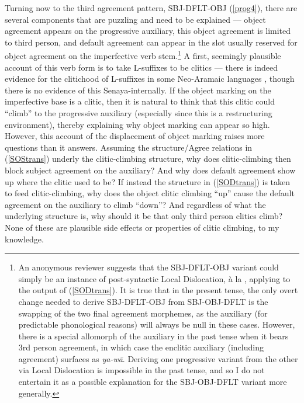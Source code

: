 \documentclass[output=paper
,modfonts
,nonflat]{langsci/langscibook}
\begin{document}
Turning now to the third agreement pattern, SBJ-DFLT-OBJ (\ref{prog4}), there are several components that are puzzling and need to be explained --- object agreement appears on the progressive auxiliary, this object agreement is limited to third person, and default agreement can appear in the slot usually reserved for object agreement on the imperfective verb stem.\footnote{An anonymous reviewer suggests that the SBJ-DFLT-OBJ variant could simply be an instance of post-syntactic Local Dislocation, \`a la \citet{EmbickNoyer01}, applying to the output of (\ref{SODtrans}). It is true that in the present tense, the only overt change needed to derive SBJ-DFLT-OBJ from SBJ-OBJ-DFLT is the swapping of the two final agreement morphemes, as the auxiliary (for predictable phonological reasons) will always be null in these cases. However, there is a special allomorph of the auxiliary in the past tense when it bears 3rd person agreement, in which case the enclitic auxiliary (including agreement) surfaces as \textit{ya-w\=a}. Deriving one progressive variant from the other via Local Dislocation is impossible in the past tense, and so I do not entertain it as a possible explanation for the SBJ-OBJ-DFLT variant more generally.} A first, seemingly  plausible account of this verb form is to take L-suffixes to be clitics --- there is indeed evidence for the clitichood of L-suffixes in some Neo-Aramaic languages \citep{DoronKhan12}, though there is no evidence of this Senaya-internally. If the object marking on the imperfective base is a clitic, then it is natural to think that this clitic could ``climb'' to the progressive auxiliary (especially since this is a restructuring environment), thereby explaining why object marking can appear so high. However, this account of the displacement of object marking raises more questions than it answers. Assuming the structure/Agree relations in (\ref{SOStrans}) underly the clitic-climbing structure, why does clitic-climbing then block subject agreement on the auxiliary? And why does default agreement show up where the clitic used to be? If instead the structure in (\ref{SODtrans}) is taken to feed clitic-climbing, why does the object clitic climbing ``up'' cause the default agreement on the auxiliary to climb ``down''? And regardless of what the underlying structure is, why should it be that only third person clitics climb? None of these are plausible side effects or properties of clitic climbing, to my knowledge.
\end{document}
